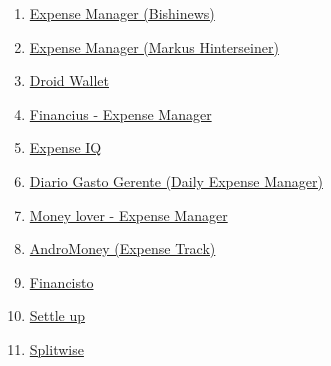 \begin{enumerate}[label=\bfseries App \arabic*]
  \item \href{https://play.google.com/store/apps/details?id=com.expensemanager}{Expense Manager (Bishinews)} \label{app:ExpenseManager1}
  \item \href{https://play.google.com/store/apps/details?id=at.markushi.expensemanager}{Expense Manager (Markus Hinterseiner)} \label{app:ExpenseManager2}
  \item \href{https://play.google.com/store/apps/details?id=com.bruno.myapps.droidwallet}{Droid Wallet} \label{app:DroidWallet}
  \item \href{https://play.google.com/store/apps/details?id=com.code44.finance}{Financius - Expense Manager} \label{app:Financius}
  \item \href{https://play.google.com/store/apps/details?id=com.handyapps.expenseiq}{Expense IQ} \label{app:Expense IQ}
  \item \href{https://play.google.com/store/apps/details?id=com.techahead.ExpenseManager}{Diario Gasto Gerente (Daily Expense Manager)} \label{app:DailyExpenseManager}
  \item \href{https://play.google.com/store/apps/details?id=com.bookmark.money}{Money lover - Expense Manager} \label{app:MoneyLover}
  \item \href{https://play.google.com/store/apps/details?id=com.kpmoney.android}{AndroMoney (Expense Track)} \label{app:AndroMoney}
  \item \href{https://play.google.com/store/apps/details?id=ru.orangesoftware.financisto}{Financisto} \label{app:Financisto}
  \item \href{https://play.google.com/store/apps/details?id=cz.destil.settleup}{Settle up} \label{app:SettleUp}
  \item \href{https://play.google.com/store/apps/details?id=com.Splitwise.SplitwiseMobile}{Splitwise} \label{Splitwise}
\end{enumerate}